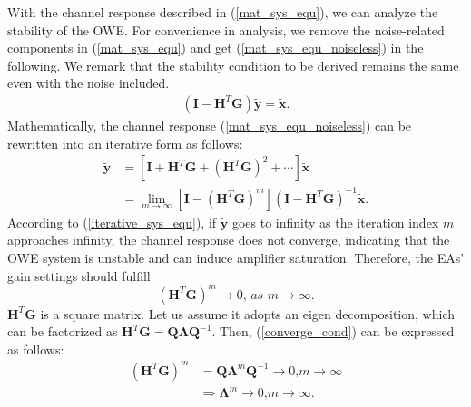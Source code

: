 With the channel response described in (\ref{mat_sys_equ}), we can analyze the stability of the OWE. For convenience in analysis, we remove the noise-related components in (\ref{mat_sys_equ}) and get (\ref{mat_sys_equ_noiseless}) in the following. We remark that the stability condition to be derived remains the same even with the noise included.
\begin{equation}
\label{mat_sys_equ_noiseless}
\begin{array}{c}
\left( {\mathbf{I} - {\mathbf{H}^T}\mathbf{G}} \right)\mathbf{\tilde y} = \mathbf{\tilde x} \text{.}
\end{array}
\end{equation}
Mathematically, the channel response (\ref{mat_sys_equ_noiseless}) can be rewritten into an iterative form as follows:
\begin{equation}
\label{iterative_sys_equ}
\begin{aligned}
\mathbf{\tilde y} &=\left[ {\mathbf{I} + \mathbf{H}^T \mathbf{G + }{\left(\mathbf{H}^T\mathbf{G}\right)^2} +  \cdots } \right]\mathbf{\tilde x}\\
&= \lim_{m\rightarrow \infty}\left[ {\mathbf{I} - {\left(\mathbf{H}^T\mathbf{G}\right)^m}} \right]{\left( {\mathbf{I} - \mathbf{H}^T\mathbf{G}} \right)^{ - 1}}\mathbf{\tilde x} \text{.}
\end{aligned}
\end{equation}
According to (\ref{iterative_sys_equ}), if $\mathbf{\tilde{y}}$ goes to infinity as the iteration index $m$ approaches infinity, the channel response does not converge, indicating that the OWE system is unstable and can induce amplifier saturation. Therefore, the EAs' gain settings should fulfill
\begin{equation}
\label{converge_cond}
{\left({\mathbf{H}^T}\mathbf{G}\right)^m} \to 0\textit{, as }m \to \infty \text{.}
\end{equation}
${\mathbf{H}^T}\mathbf{G}$ is a square matrix. Let us assume it adopts an eigen decomposition, which can be factorized as ${\mathbf{H}^T}\mathbf{G}=\mathbf{Q\Lambda }{\mathbf{Q}^{ - 1}}$. Then, (\ref{converge_cond}) can be expressed as follows:
\begin{equation}
\label{eigen_converge_cond}
\begin{aligned}
{\left({\mathbf{H}^T}\mathbf{G}\right)^m} &= \mathbf{Q}{\mathbf{\Lambda }^m}{\mathbf{Q}^{ - 1}} \to 0 \text{,} m \to \infty
\\
&\Rightarrow {\mathbf{\Lambda }^m} \to 0 \text{,} m \to \infty \text{.}
\end{aligned}
\end{equation}
